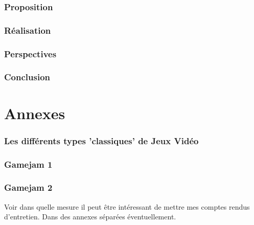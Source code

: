 \documentclass[french, 12pt]{article} %
\begin{document}
	
	\newpage
	\section{Proposition}
	
	
	\newpage
	\section{Réalisation}
	
	
	\newpage
	\section{Perspectives}
	
	
	\newpage
	\section{Conclusion}
	
	
	\newpage

	\newpage
	

\newpage
\part{Annexes} \appendix
	\section{Les différents types 'classiques' de Jeux Vidéo} \label{types_jeux}
	
	\section{Gamejam 1}
	
	
	\section{Gamejam 2}
	

Voir dans quelle mesure il peut être intéressant de mettre mes comptes rendus d'entretien. Dans des annexes séparées éventuellement.
\end{document}
